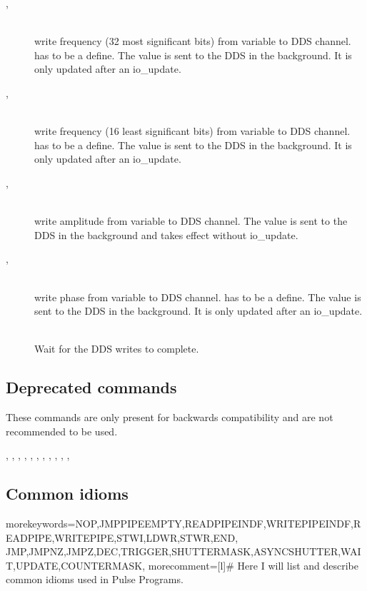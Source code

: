 \documentclass[11pt]{scrartcl}
\begin{document}
\begin{addmargin}{1cm}
\begin{description}
\item[ , ] \hfill\\ 
write frequency (32 most significant bits) from variable to DDS channel.  has to be a define. The value is sent to the DDS in the background. It is only updated after an io\_update. 

\item[ , ] \hfill\\ 
 write frequency (16 least significant bits) from variable to DDS channel.   has to be a define. The value is sent to the DDS in the background. It is only updated after an io\_update. 

\item[ , ] \hfill\\ 
 write amplitude from variable to DDS channel. The value is sent to the DDS in the background and takes effect without io\_update. 

\item[ , ] \hfill\\ 
write phase from variable to DDS channel.   has to be a define. The value is sent to the DDS in the background. It is only updated after an io\_update. 

\item[]\hfill\\
Wait for the DDS writes to complete.

\end{description}
\end{addmargin}

\subsection{Deprecated commands}
These commands are only present for backwards compatibility and are not recommended to be used.
\begin{addmargin}{1cm}
, , , , , , , , , , , 
\end{addmargin}

\subsection{Common idioms}
  { morekeywords={NOP,JMPPIPEEMPTY,READPIPEINDF,WRITEPIPEINDF,READPIPE,WRITEPIPE,STWI,LDWR,STWR,END,
    JMP,JMPNZ,JMPZ,DEC,TRIGGER,SHUTTERMASK,ASYNCSHUTTER,WAIT,UPDATE,COUNTERMASK},
 morecomment=[l]{\#}
}
\newcommand*{\Comment}[1]{\hfill\makebox[0.5\textwidth][l]{\parbox{0.5\textwidth}{\color{green}#1}}}%
Here I will list and describe common idioms used in Pulse Programs.
\end{document}

